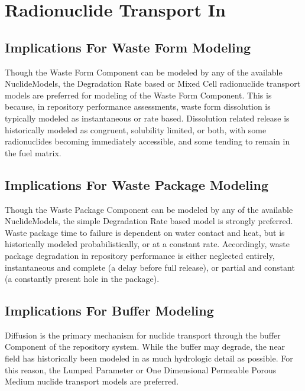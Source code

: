 \section{Radionuclide Transport In \Cyder}\label{sec:nuclide_models}








\subsection{Implications For Waste Form Modeling}

Though the Waste Form Component can be modeled by any of the available 
NuclideModels, the Degradation Rate based or Mixed Cell radionuclide transport 
models are preferred for modeling of the Waste Form Component.  This is 
because, in repository performance assessments, waste form dissolution is 
typically modeled as instantaneous or rate based. Dissolution related release 
is historically modeled as congruent, solubility limited, or both, with some 
radionuclides becoming immediately accessible, and some tending to remain in 
the fuel matrix. 

\subsection{Implications For Waste Package Modeling}

Though the Waste Package Component can be modeled by any of the available 
NuclideModels, the simple Degradation Rate based model is strongly preferred.
Waste package time to failure is dependent on water contact and heat, 
but is historically modeled probabilistically, or at a constant rate.
Accordingly, waste package degradation in repository performance is either 
neglected entirely, instantaneous and complete (a delay before full release), 
or partial and constant (a constantly present hole in the package). 


\subsection{Implications For Buffer Modeling}

Diffusion is the primary mechanism for nuclide transport through the 
buffer Component of the repository system. While the buffer may degrade, the 
near field has historically been modeled in as much hydrologic detail as 
possible. For this reason, the Lumped Parameter or One Dimensional Permeable 
Porous Medium nuclide transport models are preferred.

